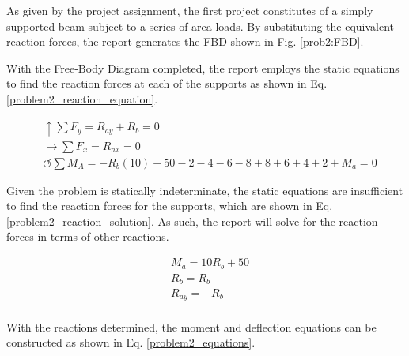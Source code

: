 \documentclass[a4paper]{article}
\begin{document}
As given by the project assignment, the first project constitutes of a simply supported beam subject to a series of area loads. By substituting the equivalent reaction forces, the report generates the FBD shown in Fig. \ref{prob2:FBD}.

With the Free-Body Diagram completed, the report employs the static equations to find the reaction forces at each of the supports as shown in Eq. \ref{problem2_reaction_equation}.

\begin{equation}
\begin{split}
	&\uparrow \sum F_y = R_{ay} + R_b = 0 \\
 	&\rightarrow \sum F_x = R_{ax} = 0 \\
 	&\circlearrowleft \sum M_A = -R_b(10) -50 - 2 - 4 - 6 - 8 + 8 + 6 + 4 + 2 + M_a = 0
\end{split}
\label{problem2_reaction_equation}
\end{equation}

Given the problem is statically indeterminate, the static equations are insufficient to find the reaction forces for the supports, which are shown in Eq. \ref{problem2_reaction_solution}. As such, the report will solve for the reaction forces in terms of other reactions.

\begin{equation}
\begin{split}
	& M_a = 10R_b + 50 \\
	& R_{b} = R_b \\
	& R_{ay} = - R_b \\
\end{split}
\label{problem2_reaction_solution}
\end{equation}

With the reactions determined, the moment and deflection equations can be constructed as shown in Eq. \ref{problem2_equations}.
\end{document}
